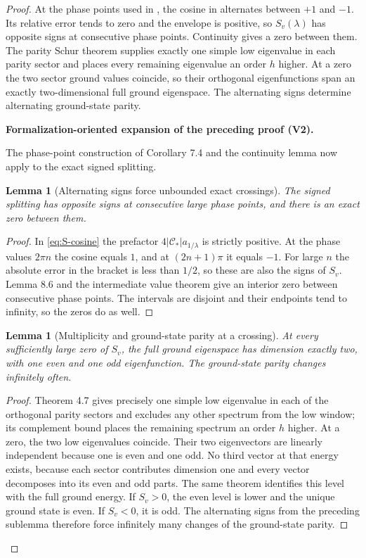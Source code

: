 \documentclass[11pt]{article}
\newtheorem{lemma}[theorem]{Lemma}
\newcommand{\formalisationparentid}{X}
\newenvironment{formalisationaddition}[1]{\par\medskip\begingroup\color{blue}\def\formalisationparentid{#1}\setcounter{formalizationsublemma}{0}\let\lemma\formalizationsublemma\let\endlemma\endformalizationsublemma
  \def\Eo{\mathcal E_h^\circ}\def\EE{\mathcal E_h}\def\phio{\phi_h^\circ}\def\phih{\phi_h}\def\Ho{H_h^{\rm atom}(v^\circ)}\def\Ha{H_h^{\rm atom}}\def\HL{H_h^{L}}\def\Dh{D_h}\def\Log{\operatorname{Log}}\def\ellh{\ell_h}\def\Gp{G_{p,h}}\def\Ast{A_{*,h}}\def\ahat{\widehat{\mathfrak a}_h}\def\ah{\mathfrak a_h}\def\rh{\widehat\rho_h}\def\deltah{\widehat\delta_h}\def\oldref##1{\textup{(##1)}}\def\interface##1{\par\noindent\textit{Analytical interface used here.} ##1\par}\def\finish{\par\noindent\textit{Conclusion of the formalization-oriented expansion.} }\par\noindent\textbf{Formalization-oriented expansion of the preceding proof (V2).}\par\smallskip
}{\par\endgroup\medskip
}
\begin{document}
\begin{proof}
At the phase points used in , the cosine in
 alternates between $+1$ and $-1$.  Its relative error
tends to zero and the envelope is positive, so $S_v(\lambda)$ has opposite
signs at consecutive phase points.  Continuity gives a zero between them.
The parity Schur theorem supplies exactly one simple low eigenvalue in each
parity sector and places every remaining eigenvalue an order $h$ higher.  At
a zero the two sector ground values coincide, so their orthogonal
eigenfunctions span an exactly two-dimensional full ground eigenspace.  The
alternating signs determine alternating ground-state parity.

\begin{formalisationaddition}{C8.7}
The phase-point construction of Corollary 7.4 and the continuity lemma now apply to the exact signed splitting.

\begin{lemma}[Alternating signs force unbounded exact crossings]\label{sublemma:C8-7-crossings}
The signed splitting has opposite signs at consecutive large phase points, and there is an exact zero between them.
\end{lemma}
\begin{proof}
In \eqref{eq:S-cosine} the prefactor $4|\mathscr C_*|a_{1/\lambda}$ is strictly positive. At the phase values $2\pi n$ the cosine equals $1$, and at $(2n+1)\pi$ it equals $-1$. For large $n$ the absolute error in the bracket is less than $1/2$, so these are also the signs of $S_v$. Lemma 8.6 and the intermediate value theorem give an interior zero between consecutive phase points. The intervals are disjoint and their endpoints tend to infinity, so the zeros do as well.
\end{proof}

\begin{lemma}[Multiplicity and ground-state parity at a crossing]\label{sublemma:C8-7-multiplicity}
At every sufficiently large zero of $S_v$, the full ground eigenspace has dimension exactly two, with one even and one odd eigenfunction. The ground-state parity changes infinitely often.
\end{lemma}
\begin{proof}
Theorem 4.7 gives precisely one simple low eigenvalue in each of the orthogonal parity sectors and excludes any other spectrum from the low window; its complement bound places the remaining spectrum an order $h$ higher. At a zero, the two low eigenvalues coincide. Their two eigenvectors are linearly independent because one is even and one odd. No third vector at that energy exists, because each sector contributes dimension one and every vector decomposes into its even and odd parts. The same theorem identifies this level with the full ground energy. If $S_v>0$, the even level is lower and the unique ground state is even. If $S_v<0$, it is odd. The alternating signs from the preceding sublemma therefore force infinitely many changes of the ground-state parity.
\end{proof}


\end{formalisationaddition}
\end{proof}
\end{document}
